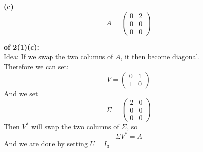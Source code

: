 \documentclass[lang=cn,11pt]{elegantbook}
\begin{document}
\textbf{(c) }$$\displaystyle
A = \begin{pmatrix}
0 & 2\\[4pt]
0 & 0\\[4pt]
0 & 0
\end{pmatrix}
$$
\begin{solution}\textbf{ of 2(1)(c):}\\
Idea: If we swap the two columns of $A$, it then become diagonal.\\
Therefore we can set:
$$
V =   \begin{pmatrix}0 & 1\\1 & 0\end{pmatrix}
$$
And we set
$$
 \Sigma = \begin{pmatrix}
   2 & 0\\[4pt]
   0 & 0\\[4pt]
   0 & 0
   \end{pmatrix}
$$
Then $V^*$ will swap the two columns of $\Sigma$, so 
$$
\Sigma V^* = A
$$
And we are done by setting $U = I_3$
\end{solution}
\end{document}

